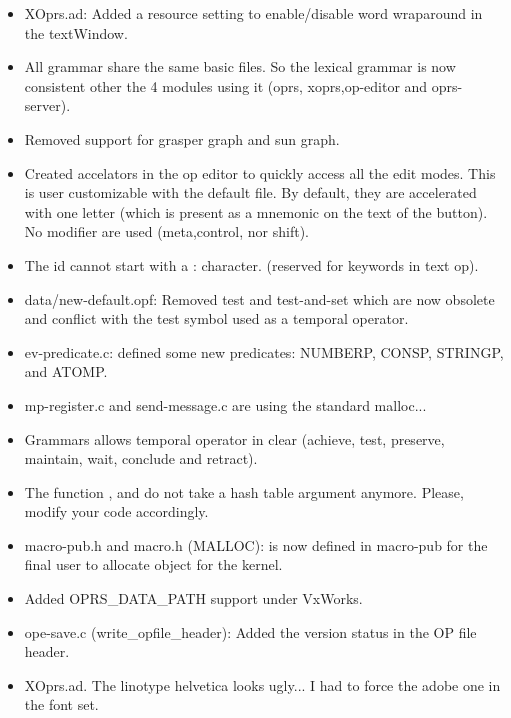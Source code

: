 \begin{itemize}
\item XOprs.ad: Added a resource setting to enable/disable word
wraparound in the textWindow.

\item All grammar share the same basic files. So the
lexical grammar is now consistent other the 4 modules using it
(oprs, xoprs,op-editor and oprs-server). 

\item Removed support for grasper graph and sun graph. 

\item Created accelators in the op editor to quickly access all the edit modes.
This is user customizable with the default file. By default, they are
accelerated with one letter (which is present as a mnemonic on the text of the
button). No modifier are used (meta,control, nor shift).

\item The id cannot start with a : character. (reserved for keywords
in text op).

\item data/new-default.opf: Removed test and test-and-set which are
now obsolete and conflict with the test symbol used as a
temporal operator.

\item ev-predicate.c: defined some new predicates: NUMBERP, CONSP,
STRINGP, and ATOMP.

\item mp-register.c and send-message.c are using the standard
malloc... 

\item Grammars allows temporal operator in clear (achieve, test,
preserve, maintain, wait, conclude and retract).

\item The function , 
 and  do not
take a hash table argument anymore. Please, modify your code accordingly.

\item macro-pub.h and macro.h (MALLOC): is now defined in macro-pub
for the final user to allocate object for the kernel.

\item Added OPRS\_DATA\_PATH support under VxWorks.

\item ope-save.c (write\_opfile\_header): Added the version status in
the OP file header.

\item XOprs.ad. The linotype helvetica looks ugly... I had to force the
adobe one in the font set.

\end{itemize}

